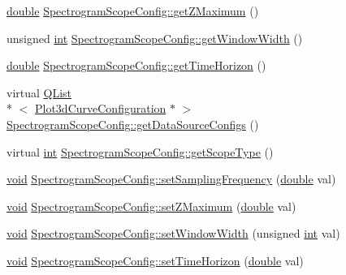 \begin{DoxyCompactItemize}
\item 
\hyperlink{_super_l_u_support_8h_a8956b2b9f49bf918deed98379d159ca7}{double} \hyperlink{group___scope_plugin_ga953b8cd98a71026b132ddace51d3111a}{Spectrogram\-Scope\-Config\-::get\-Z\-Maximum} ()
\item 
unsigned \hyperlink{ioapi_8h_a787fa3cf048117ba7123753c1e74fcd6}{int} \hyperlink{group___scope_plugin_ga38591d941f9fabb469887d48006a629c}{Spectrogram\-Scope\-Config\-::get\-Window\-Width} ()
\item 
\hyperlink{_super_l_u_support_8h_a8956b2b9f49bf918deed98379d159ca7}{double} \hyperlink{group___scope_plugin_gabf7ca6406f6b5affaf769e09e633a101}{Spectrogram\-Scope\-Config\-::get\-Time\-Horizon} ()
\item 
virtual \hyperlink{class_q_list}{Q\-List}\\*
$<$ \hyperlink{struct_plot3d_curve_configuration}{Plot3d\-Curve\-Configuration} $\ast$ $>$ \hyperlink{group___scope_plugin_ga20cd38fb6f34eae6a7a5c9e18a2184ba}{Spectrogram\-Scope\-Config\-::get\-Data\-Source\-Configs} ()
\item 
virtual \hyperlink{ioapi_8h_a787fa3cf048117ba7123753c1e74fcd6}{int} \hyperlink{group___scope_plugin_gab53e8753102217ba194ab539f0892bd7}{Spectrogram\-Scope\-Config\-::get\-Scope\-Type} ()
\item 
\hyperlink{group___u_a_v_objects_plugin_ga444cf2ff3f0ecbe028adce838d373f5c}{void} \hyperlink{group___scope_plugin_ga3e3207be4ff4a10b7ec3df051d76c3f6}{Spectrogram\-Scope\-Config\-::set\-Sampling\-Frequency} (\hyperlink{_super_l_u_support_8h_a8956b2b9f49bf918deed98379d159ca7}{double} val)
\item 
\hyperlink{group___u_a_v_objects_plugin_ga444cf2ff3f0ecbe028adce838d373f5c}{void} \hyperlink{group___scope_plugin_ga4f71e9c45cd8cbebb11505f9f6d18a42}{Spectrogram\-Scope\-Config\-::set\-Z\-Maximum} (\hyperlink{_super_l_u_support_8h_a8956b2b9f49bf918deed98379d159ca7}{double} val)
\item 
\hyperlink{group___u_a_v_objects_plugin_ga444cf2ff3f0ecbe028adce838d373f5c}{void} \hyperlink{group___scope_plugin_gaf3bc69a747cec5908674e2df1118cd82}{Spectrogram\-Scope\-Config\-::set\-Window\-Width} (unsigned \hyperlink{ioapi_8h_a787fa3cf048117ba7123753c1e74fcd6}{int} val)
\item 
\hyperlink{group___u_a_v_objects_plugin_ga444cf2ff3f0ecbe028adce838d373f5c}{void} \hyperlink{group___scope_plugin_ga511f9914f1f524bd49a6edfa18760501}{Spectrogram\-Scope\-Config\-::set\-Time\-Horizon} (\hyperlink{_super_l_u_support_8h_a8956b2b9f49bf918deed98379d159ca7}{double} val)

\end{DoxyCompactItemize}
